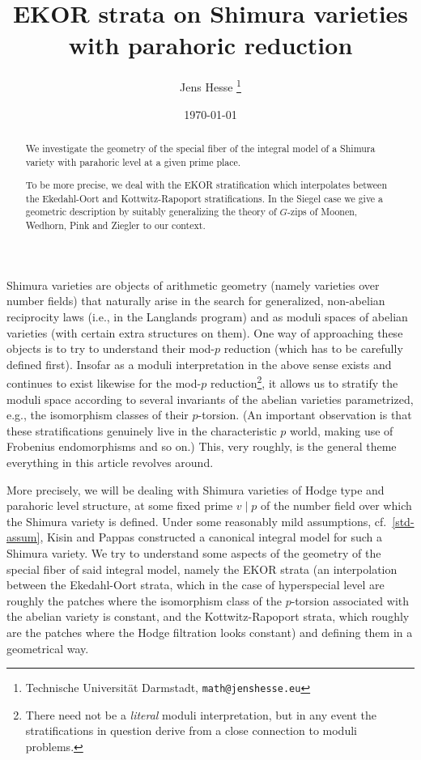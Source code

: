 \documentclass[a4paper]{scrartcl} %
\title{EKOR strata on Shimura varieties with parahoric reduction}
\author{Jens Hesse
\thanks{Technische Universit\"at Darmstadt, \texttt{math@jenshesse.eu}}}
\date{\today}
\numberwithin{equation}{section}
\begin{document}
\maketitle
	
\begin{abstract}
  We investigate the geometry of the special fiber of the integral model of a Shimura variety with parahoric level at a given prime place.

To be more precise, we deal with the EKOR stratification which interpolates between the Ekedahl-Oort and Kottwitz-Rapoport stratifications. In the Siegel case we give a geometric description by suitably generalizing the theory of $G$-zips of Moonen, Wedhorn, Pink and Ziegler to our context.
\end{abstract}

	
\tableofcontents
	
	

Shimura varieties are objects of arithmetic geometry (namely varieties over number fields) that naturally arise in the search for generalized, non-abelian reciprocity laws (i.e., in the Langlands program) and as moduli spaces of abelian varieties (with certain extra structures on them). One way of approaching these objects is to try to understand their mod-$p$ reduction (which has to be carefully defined first). Insofar as a moduli interpretation in the above sense exists and continues to exist likewise for the mod-$p$ reduction\footnote{There need not be a \emph{literal} moduli interpretation, but in any event the stratifications in question derive from a close connection to moduli problems.}, it allows us to stratify the moduli space according to  several invariants of the abelian varieties parametrized, e.g., the isomorphism classes of their $p$-torsion. (An important observation is that these stratifications genuinely live in the characteristic $p$ world, making use of Frobenius endomorphisms and so on.) This, very roughly, is the general theme everything in this article revolves around.

More precisely, we will be dealing with Shimura varieties of Hodge type and parahoric level structure, at some fixed prime $v \mid p$ of the number field over which the Shimura variety is defined. Under some reasonably mild assumptions, cf.~\ref{std-assum}, Kisin and Pappas \cite{kisin-pappas} constructed a canonical integral model for such a Shimura variety. We try to understand some aspects of the geometry of the special fiber  of said integral model, namely the EKOR strata (an interpolation between the Ekedahl-Oort strata, which in the case of hyperspecial level are roughly the patches where the isomorphism class of the $p$-torsion associated with the abelian variety is constant, and the Kottwitz-Rapoport strata, which roughly are the patches where the Hodge filtration looks constant) and defining them in a geometrical way.
\end{document}
